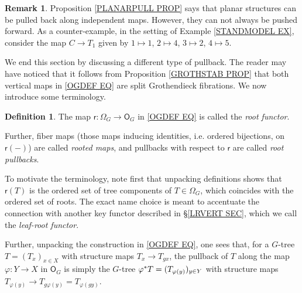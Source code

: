 \documentclass[a4paper,10pt
,draft
]{article}%
\numberwithin{equation}{section}
\numberwithin{figure}{section}
\theoremstyle{definition} %
\newtheorem{definition}[equation]{Definition}%
\newtheorem{remark}[equation]{Remark}%
\newcommand{\Fin}{\mathsf{F}}%
\newcommand{\1}{\ensuremath{\mathbbm 1}}%
\begin{document}
\begin{remark}\label{PULLPLANAR REM}
Proposition \ref{PLANARPULL PROP} says that planar structures can be pulled back along independent maps. However, they can not always be pushed forward. As a counter-example, in the setting of Example \ref{STANDMODEL EX}, consider the map $C \to T_1$ given by $1 \mapsto 1$, $2 \mapsto 4$, $3 \mapsto 2$, $4 \mapsto 5$.
\end{remark}


We end this section by discussing a different type of pullback.
The reader may have noticed that it follows from 
Proposition \ref{GROTHSTAB PROP}
that both vertical maps in \eqref{OGDEF EQ}
are split Grothendieck fibrations. We now introduce some terminology.


\begin{definition}\label{ROOTPULL DEF}
The map $\mathsf{r} \colon \Omega_G \to \mathsf{O}_G$
in \eqref{OGDEF EQ} is called the \textit{root functor}.
\index{Gtreesroot@$\mathsf{r}\colon \Phi \to \Fin$}

Further, fiber maps (those maps inducing identities, i.e. ordered bijections, on $\mathsf{r}(\minus)$) are called \textit{rooted maps}, and pullbacks with respect to $\mathsf{r}$ are called
\textit{root pullbacks}.
\end{definition}

To motivate the terminology, 
note first that unpacking definitions shows that 
$\mathsf{r}(T)$ is the ordered set of tree components of  
$T\in \Omega_G$,
which coincides with the ordered set of roots.
The exact name choice is meant to accentuate the connection with another key functor
described in \S \ref{LRVERT SEC},
which we call the \textit{leaf-root functor}.

Further, unpacking the construction in \eqref{OGDEF EQ}, one sees that,
for a $G$-tree $T = (T_x)_{x \in X}$
with structure maps $T_x \to T_{g x}$,
the pullback of $T$
along the map 
$\varphi \colon Y \to X$ in $\mathsf{O}_G$
is simply the $G$-tree
$\varphi^{\**}T=(T_{\varphi(y)})_{y \in Y}$
with structure maps 
$T_{\varphi(y)} \to T_{g \varphi(y)} = T_{\varphi(g y)}$.
\end{document}
